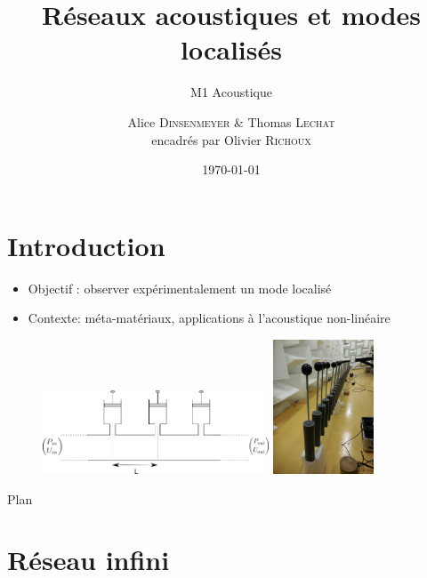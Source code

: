 \documentclass[12pt,xcolor=x11names,compress, notes=show]{beamer}%
\author{Alice \textsc{Dinsenmeyer} \& Thomas \textsc{Lechat} \\ encadrés par Olivier \textsc{Richoux}}
\title{ Réseaux acoustiques et modes localisés}
\subtitle{M1 Acoustique}
\date{\today}
\begin{document}
\begin{frame}
	\titlepage 
\end{frame}



\section*{Introduction}
\begin{frame}{\insertsectionhead}

\begin{itemize}
\item Objectif : observer expérimentalement un mode localisé
\item Contexte: méta-matériaux, applications à l'acoustique non-linéaire
\end{itemize}
	\centering
	\begin{figure}
		\centering
		\includegraphics[height=2.5cm]{schema_reseau_infini.png}\vspace{1.3cm}\hspace{0.5cm}
		\centering
		\includegraphics[height=4cm]{photo.jpg}
	\end{figure}
	
\end{frame}

\begin{frame}{Plan}
\tableofcontents[hideallsubsections]
\end{frame}


\section{Réseau infini}
\end{document}
